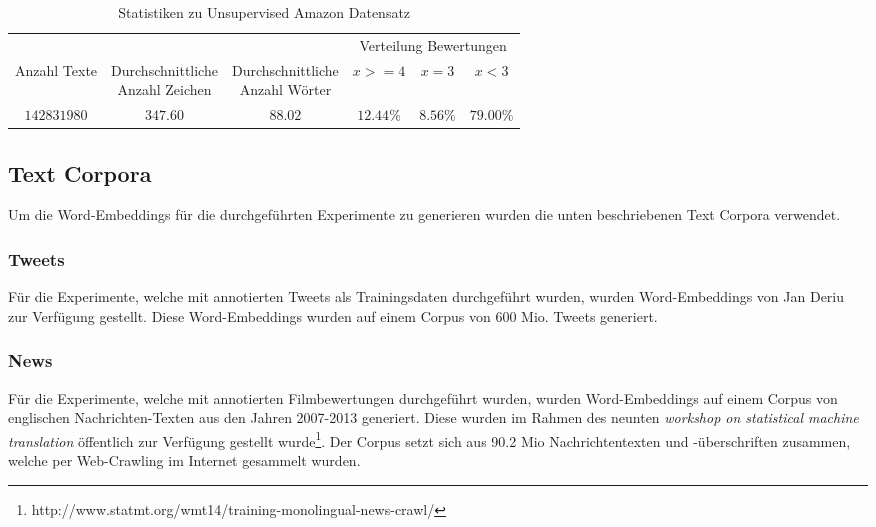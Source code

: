 \begin{table}[h]
	\centering
	\begin{adjustbox}{max width=\textwidth}
		\begin{tabular}{@{}cccccc@{}}
			\toprule
			& & & \multicolumn{3}{c}{Verteilung Bewertungen}\\
			\cmidrule(r){4-6}
			Anzahl Texte & \specialcell{Durchschnittliche\\Anzahl Zeichen} & \specialcell{Durchschnittliche\\Anzahl Wörter} & $x >= 4$ & $x = 3$ & $x < 3$\\ \midrule
			$142831980$ & $347.60$ & $88.02$ & $12.44\%$ & $8.56\%$ & $79.00\%$\\
			\bottomrule
		\end{tabular}
	\end{adjustbox}
	\caption{Statistiken zu Unsupervised Amazon Datensatz}
\end{table}

\subsection{Text Corpora}
Um die Word-Embeddings für die durchgeführten Experimente zu generieren wurden die unten beschriebenen Text Corpora verwendet.

\subsubsection{Tweets}
Für die Experimente, welche mit annotierten Tweets als Trainingsdaten durchgeführt wurden, wurden Word-Embeddings von Jan Deriu zur Verfügung gestellt. Diese Word-Embeddings wurden auf einem Corpus von 600 Mio. Tweets generiert.

\subsubsection{News}
Für die Experimente, welche mit annotierten Filmbewertungen durchgeführt wurden, wurden Word-Embeddings auf einem Corpus von englischen Nachrichten-Texten aus den Jahren 2007-2013 generiert. Diese wurden im Rahmen des neunten \emph{workshop on statistical machine translation} öffentlich zur Verfügung gestellt wurde\footnote{http://www.statmt.org/wmt14/training-monolingual-news-crawl/}. Der Corpus setzt sich aus 90.2 Mio Nachrichtentexten und -überschriften zusammen, welche per Web-Crawling im Internet gesammelt wurden. 
